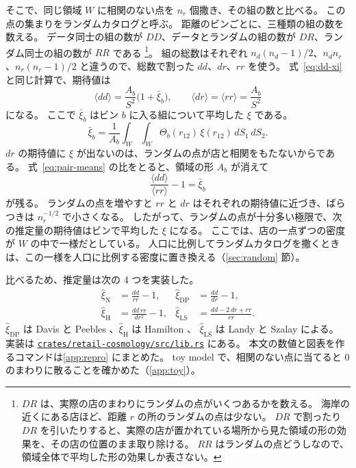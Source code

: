 \documentclass[a4paper,11pt]{ltjsarticle}
\newcommand{\repourl}{https://github.com/inuverse44/retail-cosmology}
\begin{document}
そこで、同じ領域 $W$ に相関のない点を $n_r$ 個撒き、その組の数と比べる。
この点の集まりをランダムカタログと呼ぶ。
距離のビンごとに、三種類の組の数を数える。
データ同士の組の数が $DD$、データとランダムの組の数が $DR$、ランダム同士の組の数が $RR$ である
\footnote{$DR$ は、実際の店のまわりにランダムの点がいくつあるかを数える。
  海岸の近くにある店ほど、距離 $r$ の所のランダムの点は少ない。
  $DR$ で割ったり $DR$ を引いたりすると、実際の店が置かれている場所から見た領域の形の効果を、その店の位置のまま取り除ける。
  $RR$ はランダムの点どうしなので、領域全体で平均した形の効果しか表さない。}。
組の総数はそれぞれ $n_d(n_d-1)/2$、$n_d n_r$、$n_r(n_r-1)/2$ と違うので、総数で割った $dd$、$dr$、$rr$ を使う。
式~\eqref{eq:dd-xi} と同じ計算で、期待値は
\begin{equation}
  \langle dd \rangle = \frac{A_b}{S^2}\bigl(1 + \bar\xi_b\bigr), \qquad
  \langle dr \rangle = \langle rr \rangle = \frac{A_b}{S^2}
  \label{eq:pair-means}
\end{equation}
になる。
ここで $\bar\xi_b$ はビン $b$ に入る組について平均した $\xi$ である。
\begin{equation}
  \bar\xi_b = \frac{1}{A_b} \int_W \! \int_W \Theta_b(r_{12})\, \xi(r_{12})\, dS_1\, dS_2 .
\end{equation}
$dr$ の期待値に $\xi$ が出ないのは、ランダムの点が店と相関をもたないからである。
式~\eqref{eq:pair-means} の比をとると、領域の形 $A_b$ が消えて
\begin{equation}
  \frac{\langle dd \rangle}{\langle rr \rangle} - 1 = \bar\xi_b
\end{equation}
が残る。
ランダムの点を増やすと $rr$ と $dr$ はそれぞれの期待値に近づき、ばらつきは $n_r^{-1/2}$ で小さくなる。
したがって、ランダムの点が十分多い極限で、次の推定量の期待値はビンで平均した $\xi$ になる。
ここでは、店の一点ずつの密度が $W$ の中で一様だとしている。
人口に比例してランダムカタログを撒くときは、この一様を人口に比例する密度に置き換える（\ref{sec:random} 節）。

比べるため、推定量は次の 4 つを実装した。
\begin{align}
  \hat\xi_{\mathrm{N}}  &= \frac{dd}{rr} - 1, &
  \hat\xi_{\mathrm{DP}} &= \frac{dd}{dr} - 1, \\
  \hat\xi_{\mathrm{H}}  &= \frac{dd\, rr}{dr^2} - 1, &
  \hat\xi_{\mathrm{LS}} &= \frac{dd - 2\,dr + rr}{rr}.
  \label{eq:estimators}
\end{align}
$\hat\xi_{\mathrm{DP}}$ は Davis と Peebles \cite{DavisPeebles1983}、$\hat\xi_{\mathrm{H}}$ は Hamilton \cite{Hamilton1993}、
$\hat\xi_{\mathrm{LS}}$ は Landy と Szalay \cite{LandySzalay1993} による。
実装は \href{\repourl/blob/main/crates/retail-cosmology/src/lib.rs}{\nolinkurl{crates/retail-cosmology/src/lib.rs}} にある。
本文の数値と図表を作るコマンドは\ref{app:repro} にまとめた。
toy model で、相関のない点に当てると $0$ のまわりに散ることを確かめた（\ref{app:toy}）。
\end{document}
